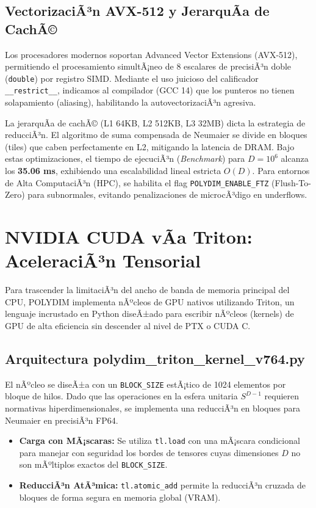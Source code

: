 \subsection{VectorizaciÃ³n AVX-512 y JerarquÃ­a de CachÃ©}
Los procesadores modernos soportan Advanced Vector Extensions (AVX-512), permitiendo el procesamiento simultÃ¡neo de 8 escalares de precisiÃ³n doble (\texttt{double}) por registro SIMD. Mediante el uso juicioso del calificador \texttt{\_\_restrict\_\_}, indicamos al compilador (GCC 14) que los punteros no tienen solapamiento (aliasing), habilitando la autovectorizaciÃ³n agresiva.

La jerarquÃ­a de cachÃ© (L1 64KB, L2 512KB, L3 32MB) dicta la estrategia de reducciÃ³n. El algoritmo de suma compensada de Neumaier se divide en bloques (tiles) que caben perfectamente en L2, mitigando la latencia de DRAM. 
Bajo estas optimizaciones, el tiempo de ejecuciÃ³n (\textit{Benchmark}) para \(D=10^6\) alcanza los \textbf{35.06 ms}, exhibiendo una escalabilidad lineal estricta \(O(D)\). Para entornos de Alta ComputaciÃ³n (HPC), se habilita el flag \texttt{POLYDIM\_ENABLE\_FTZ} (Flush-To-Zero) para subnormales, evitando penalizaciones de microcÃ³digo en underflows.

\section{NVIDIA CUDA vÃ­a Triton: AceleraciÃ³n Tensorial}


Para trascender la limitaciÃ³n del ancho de banda de memoria principal del CPU, POLYDIM implementa nÃºcleos de GPU nativos utilizando Triton, un lenguaje incrustado en Python diseÃ±ado para escribir nÃºcleos (kernels) de GPU de alta eficiencia sin descender al nivel de PTX o CUDA C.

\subsection{Arquitectura polydim\_triton\_kernel\_v764.py}
El nÃºcleo se diseÃ±a con un \texttt{BLOCK\_SIZE} estÃ¡tico de 1024 elementos por bloque de hilos. Dado que las operaciones en la esfera unitaria \(S^{D-1}\) requieren normativas hiperdimensionales, se implementa una reducciÃ³n en bloques para Neumaier en precisiÃ³n FP64. 

\begin{itemize}
    \item \textbf{Carga con MÃ¡scaras:} Se utiliza \texttt{tl.load} con una mÃ¡scara condicional para manejar con seguridad los bordes de tensores cuyas dimensiones \(D\) no son mÃºltiplos exactos del \texttt{BLOCK\_SIZE}.
    \item \textbf{ReducciÃ³n AtÃ³mica:} \texttt{tl.atomic\_add} permite la reducciÃ³n cruzada de bloques de forma segura en memoria global (VRAM).
\end{itemize}

